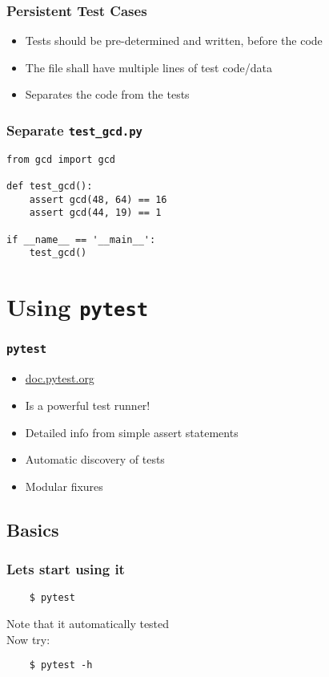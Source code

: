 \documentclass[14pt,compress]{beamer}
\begin{document}
\begin{frame}[fragile]
  \frametitle{Persistent Test Cases}
  \begin{itemize}
  \item Tests should be pre-determined and written, before the code
  \item The file shall have multiple lines of test code/data
  \item Separates the code from the tests
  \end{itemize}
\end{frame}

\begin{frame}[fragile]
    \frametitle{Separate \texttt{test\_gcd.py}}
\begin{lstlisting}
from gcd import gcd

def test_gcd():
    assert gcd(48, 64) == 16
    assert gcd(44, 19) == 1

if __name__ == '__main__':
    test_gcd()
\end{lstlisting}
\end{frame}

\section{Using \texttt{pytest}}

\begin{frame}
  \frametitle{\texttt{pytest}}
  \begin{itemize}
  \item \url{doc.pytest.org}
  \item Is a powerful test runner!
  \item Detailed info from simple assert statements
  \item Automatic discovery of tests
  \item Modular fixures
  \end{itemize}
\end{frame}

\subsection{Basics}

\begin{frame}[fragile]
  \frametitle{Lets start using it}
  \begin{lstlisting}
    $ pytest
  \end{lstlisting}%
  Note that it automatically tested \\

  Now try:
  \begin{lstlisting}
    $ pytest -h
  \end{lstlisting}%
\end{frame}
\end{document}
